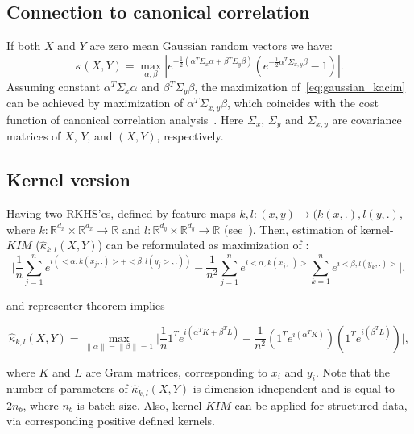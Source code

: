 \documentclass{article}
\begin{document}
\subsection{Connection to canonical correlation}
If both $X$ and $Y$ are zero mean Gaussian random vectors we have:
\begin{equation}
\label{eq:gaussian_kacim}
\kappa(X,Y) = \max_{\alpha, \beta} | e^{-\frac{1}{2} (\alpha^{T}\Sigma_{x}\alpha + \beta{^T}\Sigma_{y}\beta)}(e^{-\frac{1}{2}\alpha{^T}\Sigma_{x,y}\beta} - 1)|.
\end{equation}
Assuming constant $\alpha^{T}\Sigma_{x}\alpha$ and  $\beta{^T}\Sigma_{y}\beta$, the maximization of~\eqref{eq:gaussian_kacim} can be achieved by maximization of  $\alpha{^T}\Sigma_{x,y}\beta$, which coincides with the cost function of canonical correlation analysis~\cite{CCA}. Here $\Sigma_{x}$, $\Sigma_{y}$ and  $\Sigma_{x,y}$ are covariance matrices of $X$, $Y$, and $(X,Y)$, respectively. %

\subsection{Kernel version}

Having two RKHS'es, defined by feature maps $k,l: (x,y) \rightarrow (k(x,.), l(y,.)$, where $k: \mathbb{R}^{d_{x}} \times \mathbb{R}^{d_{x}} \rightarrow \mathbb{R}$ and $l: \mathbb{R}^{d_{y}} \times \mathbb{R}^{d_{y}} \rightarrow \mathbb{R}$ (see~\cite{10.5555/3279302}). Then, estimation of kernel-$KIM$ ($\hat{\kappa}_{k,l} (X,Y)$) can be reformulated as maximization of :
\begin{equation}
\label{eq:kernel_estimator}
    \vert \frac{1}{n} \sum_{j=1}^{n} e^{i(<\alpha, k(x_{j},.)> + <\beta, l(y_{j}>,.)) } - \frac{1}{n^2} \sum_{j=1}^{n} e^{i <\alpha, k(x_{j},.)>}\sum_{k=1}^{n} e^{i<\beta, l(y_{k},.)>}\vert,
\end{equation}

and representer theorem\cite{?} implies 

\begin{equation}
\label{eq:kernel_estimator1}
    \hat{\kappa}_{k,l} (X,Y) = \max_{\|\alpha\| = \|\beta\| = 1} \vert \frac{1}{n} 1^{T} e^{i(\alpha^{T} K + \beta^{T} L)} - \frac{1}{n^2} (1^{T} e^{i(\alpha^{T}K)}) (1^{T} e^{i(\beta^{T}L)}) \vert,
\end{equation}

where $K$ and $L$ are Gram matrices, corresponding to $x_{i}$ and $y_{i}$. Note that the number of parameters of $\hat{\kappa}_{k,l} (X,Y)$ is dimension-idnependent and is equal to $2n_{b}$, where $n_{b}$ is batch size. Also, kernel-$KIM$ can be applied for structured data, via corresponding positive defined kernels.
\end{document}
